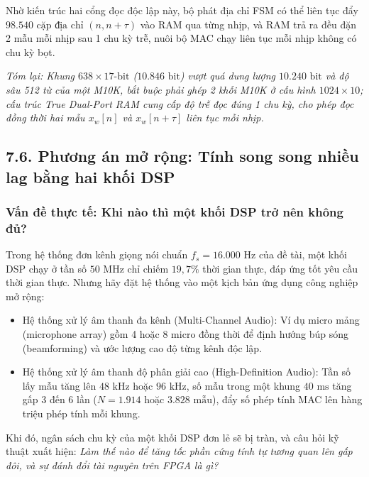 Nhờ kiến trúc hai cổng đọc độc lập này, bộ phát địa chỉ FSM có thể liên tục đẩy $98.540\text{ cặp địa chỉ}$ $(n, n+\tau)$ vào RAM qua từng nhịp, và RAM trả ra đều đặn 2 mẫu mỗi nhịp sau 1 chu kỳ trễ, nuôi bộ MAC chạy liên tục mỗi nhịp không có chu kỳ bọt.

\textit{Tóm lại: Khung $638 \times 17\text{-bit}$ ($10.846\text{ bit}$) vượt quá dung lượng $10.240\text{ bit}$ và độ sâu 512 từ của một M10K, bắt buộc phải ghép 2 khối M10K ở cấu hình $1024 \times 10$; cấu trúc True Dual-Port RAM cung cấp độ trễ đọc đúng 1 chu kỳ, cho phép đọc đồng thời hai mẫu $x_w[n]$ và $x_w[n+\tau]$ liên tục mỗi nhịp.}


\subsection*{7.6. Phương án mở rộng: Tính song song nhiều lag bằng hai khối DSP}

\subsubsection*{Vấn đề thực tế: Khi nào thì một khối DSP trở nên không đủ?}
Trong hệ thống đơn kênh giọng nói chuẩn $f_s = 16.000\text{ Hz}$ của đề tài, một khối DSP chạy ở tần số $50\text{ MHz}$ chỉ chiếm $19{,}7\%$ thời gian thực, đáp ứng tốt yêu cầu thời gian thực. Nhưng hãy đặt hệ thống vào một kịch bản ứng dụng công nghiệp mở rộng:
\begin{itemize}[leftmargin=1.5em, itemsep=2pt]
    \item Hệ thống xử lý âm thanh đa kênh (Multi-Channel Audio): Ví dụ micro mảng (microphone array) gồm 4 hoặc 8 micro đồng thời để định hướng búp sóng (beamforming) và ước lượng cao độ từng kênh độc lập.
    \item Hệ thống xử lý âm thanh độ phân giải cao (High-Definition Audio): Tần số lấy mẫu tăng lên $48\text{ kHz}$ hoặc $96\text{ kHz}$, số mẫu trong một khung $40\text{ ms}$ tăng gấp 3 đến 6 lần ($N = 1.914$ hoặc $3.828\text{ mẫu}$), đẩy số phép tính MAC lên hàng triệu phép tính mỗi khung.
\end{itemize}
Khi đó, ngân sách chu kỳ của một khối DSP đơn lẻ sẽ bị tràn, và câu hỏi kỹ thuật xuất hiện: \emph{Làm thế nào để tăng tốc phần cứng tính tự tương quan lên gấp đôi, và sự đánh đổi tài nguyên trên FPGA là gì?}

